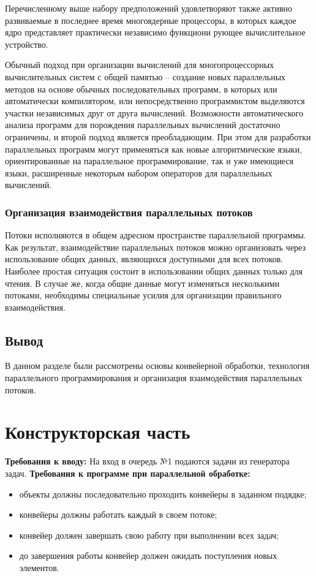 \documentclass[12pt]{report}
\begin{document}
Перечисленному выше набору предположений удовлетворяют также активно развиваемые в последнее время многоядерные процессоры, в которых каждое ядро представляет практически независимо функциони рующее вычислительное устройство.

Обычный подход при организации вычислений для многопроцессорных вычислительных систем с общей памятью – создание новых параллельных методов на основе обычных последовательных программ, в которых или автоматически компилятором, или непосредственно программистом выделяются участки независимых друг от друга вычислений. Возможности автоматического анализа программ для порождения параллельных вычислений достаточно ограничены, и второй подход является преобладающим. При этом для разработки параллельных программ могут применяться как новые алгоритмические языки, ориентированные на параллельное программирование, так и уже имеющиеся языки, расширенные некоторым набором операторов для параллельных вычислений.


\subsection{Организация взаимодействия параллельных потоков}
Потоки исполняются в общем адресном пространстве параллельной программы. Как результат, взаимодействие параллельных потоков можно организовать через использование общих данных, являющихся доступными для всех потоков. Наиболее простая ситуация состоит в использовании общих данных только для чтения. В случае же, когда общие данные могут изменяться несколькими потоками, необходимы специальные усилия для организации правильного взаимодействия.

\section{Вывод}
В данном разделе были рассмотрены основы конвейерной обработки, технология параллельного программирования и
организация взаимодействия параллельных потоков.

\chapter{Конструкторская часть}
\textbf{Требования к вводу:}
На вход в очередь №1 подаются задачи из генератора задач.
\newline
\textbf{Требования к программе при параллельной обработке:}
\begin{itemize}
	\item объекты должны последовательно проходить конвейеры в заданном подядке;
	\item конвейеры должны работать каждый в своем потоке;
	\item конвейер должен завершать свою работу при выполнении всех задач;
	\item до завершения работы конвейер должен ожидать поступления новых элементов.
\end{itemize}
\end{document}
